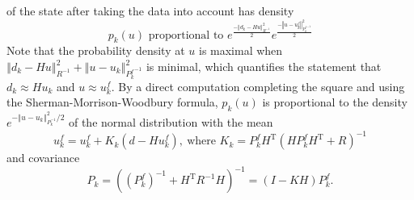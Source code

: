 \documentclass[12pt]{article}%
\begin{document}
of the state after taking the data into account has density%
$$
p_{k}\left(  u\right)  \text{ proportional to }e^\frac{-\left\Vert d_{k}
-Hu\right\Vert_{R^{-1}}^{2}}{2}e^\frac{-\left\Vert u-u_{k}^{f}\right\Vert _{
{P_{k}^f}^{-1}  }^{2}}{2}%
$$
Note that the probability density at $u$ is maximal when $\left\Vert
d_{k}-Hu\right\Vert _{R^{-1}}^{2}+\left\Vert u-u_{k}\right\Vert _{{P_{k}^{f}}^{-1}}^{2}$
 is minimal, which quantifies the statement that $d_{k}\approx
Hu_{k}$ and $u\approx u_{k}^{f}$.  By a direct computation completing the
square and using the Sherman-Morrison-Woodbury formula, $p_{k}\left(
u\right)  $ is proportional to the density $e^{-\left\Vert u-u_{k}\right\Vert
_{P_{k}^{-1}}^{2}/2}$ of the normal distribution with the mean%
$$
u_{k}^{f}=u_{k}^{f}+K_{k}(d-Hu_{k}^{f}),\ \text{where }K_{k}=P_{k}%
^{f}H^{\mathrm{T}}(HP_{k}^{f}H^{\mathrm{T}}+R)^{-1}%
$$
and covariance%
$$
P_{k}=\left(  \left(  P_{k}^{f}\right)  ^{-1}+H^{\mathrm{T}}R^{-1}H\right)
^{-1}=(I-KH)P_{k}^{f}.
$$
\end{document}
